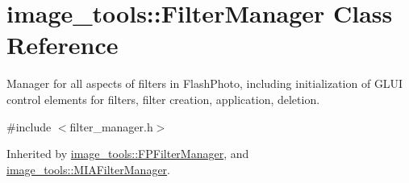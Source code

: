 \hypertarget{classimage__tools_1_1FilterManager}{}\section{image\+\_\+tools\+:\+:Filter\+Manager Class Reference}
\label{classimage__tools_1_1FilterManager}


Manager for all aspects of filters in Flash\+Photo, including initialization of G\+L\+UI control elements for filters, filter creation, application, deletion.  




{\ttfamily \#include $<$filter\+\_\+manager.\+h$>$}



Inherited by \hyperlink{classimage__tools_1_1FPFilterManager}{image\+\_\+tools\+::\+F\+P\+Filter\+Manager}, and \hyperlink{classimage__tools_1_1MIAFilterManager}{image\+\_\+tools\+::\+M\+I\+A\+Filter\+Manager}.

